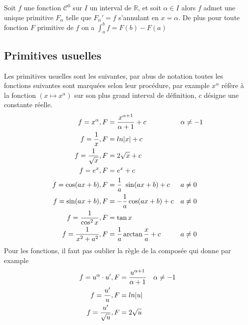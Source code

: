 \documentclass[11pt,colorlinks]{book}
\theoremstyle{mytheoremstyle}
\theoremstyle{mytheoremstyle}
\theoremstyle{mytheoremstyle}
\theoremstyle{mytheoremstyle}
\theoremstyle{mytheoremstyle}
\theoremstyle{mytheoremstyle}
\theoremstyle{mytheoremstyle}
\theoremstyle{mytheoremstyle}
\theoremstyle{myproblemstyle}
\def\mbb#1{\mathbb{#1}}
\def\bR{\mbb{R}}
\begin{document}
  \begin{theorem}
    Soit $f$ une fonction $\mathcal{C}^0$ sur $I$ un interval de $\bR$, et soit $\alpha \in I$ alors $f$ admet une unique primitive $F_{\alpha}$ 
    telle que $F_{\alpha}' = f$ s'annulant en $x=\alpha$.
    De plus pour toute fonction $F$ primitive de $f$ on a $\int_a^b f = F(b) - F(a)$
  \end{theorem}
  \subsection{Primitives usuelles}
  \begin{prop}
    Les primitives usuelles sont les suivantes, par abus de notation toutes les fonctions suivantes 
    sont marquées selon leur procédure, par example $x^{\alpha}$ réfère à la fonction $(x \mapsto x^{\alpha})$ sur son plus grand interval de 
    définition, $c$ désigne une constante réelle.
    \begin{align*}
      f = x^{\alpha}, F &= \dfrac{x^{\alpha+1}}{\alpha+1} + c && \alpha \not= -1 \\ 
      f = \dfrac{1}{x}, F &= ln \abs{x} + c \\ 
      f = \dfrac{1}{\sqrt{x}}, F &= 2\sqrt{x} + c \\ 
      f = e^x, F &= e^x + c \\
      f = \cos (ax+b), F &= \dfrac{1}{a} \sin (ax+b) + c && a \not= 0 \\ 
      f = \sin (ax+b), F &= - \dfrac{1}{a} \cos(ax+b) + c && a \not= 0 \\
      f = \dfrac{1}{\cos^2 x}, F &= \tan x \\ 
      f = \dfrac{1}{x^2+a^2}, F &= \dfrac{1}{a} \arctan \dfrac{x}{a} + c && a \not= 0 
    \end{align*}
    Pour les fonctions, il faut pas oublier la règle de la composée qui donne par example
    \begin{align*}
      f = u^{\alpha} \cdot u', F &= \dfrac{u^{\alpha+1}}{\alpha+1} && \alpha \not=-1 \\ 
      f = \dfrac{u'}{u}, F &= ln \abs{u} \\
      f = \dfrac{u'}{\sqrt{u}}, F &= 2\sqrt{u}
    \end{align*}
  \end{prop}
\end{document}
